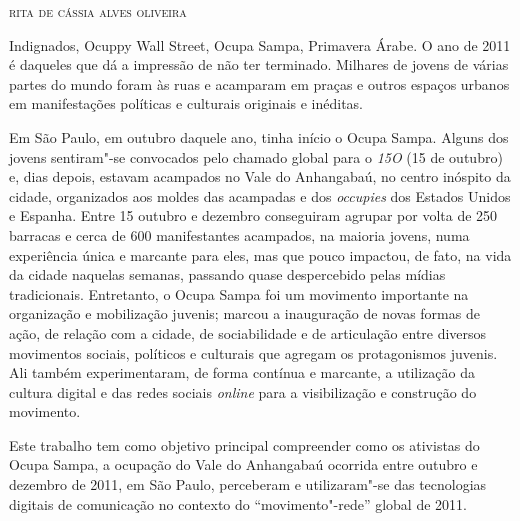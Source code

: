 
\begin{flushright}
\textsc{rita de cássia alves oliveira}
\end{flushright}

\noindent{}Indignados, Ocuppy Wall Street, Ocupa Sampa, Primavera Árabe. O ano de
2011 é daqueles que dá a impressão de não ter terminado. Milhares de
jovens de várias partes do mundo foram às ruas e acamparam em praças e
outros espaços urbanos em manifestações políticas e culturais originais
e inéditas.

Em São Paulo, em outubro daquele ano, tinha início o Ocupa Sampa. Alguns
dos jovens sentiram"-se convocados pelo chamado global para o \textit{15O} (15 de
outubro) e, dias depois, estavam acampados no Vale do Anhangabaú, no
centro inóspito da cidade, organizados aos moldes das acampadas e dos
\textit{occupies} dos Estados Unidos e Espanha. Entre 15 outubro e dezembro
conseguiram agrupar por volta de 250 barracas e cerca de 600
manifestantes acampados, na maioria jovens, numa experiência única e
marcante para eles, mas que pouco impactou, de fato, na vida da cidade
naquelas semanas, passando quase despercebido pelas mídias tradicionais.
Entretanto, o Ocupa Sampa foi um movimento importante na organização e
mobilização juvenis; marcou a inauguração de novas formas de ação, de
relação com a cidade, de sociabilidade e de articulação entre diversos
movimentos sociais, políticos e culturais que agregam os protagonismos
juvenis. Ali também experimentaram, de forma contínua e marcante, a
utilização da cultura digital e das redes sociais \textit{online} para a
visibilização e construção do movimento.

Este trabalho tem como objetivo principal compreender como os
ativistas do Ocupa Sampa, a ocupação do Vale do Anhangabaú ocorrida
entre outubro e dezembro de 2011, em São Paulo, perceberam e
utilizaram"-se das tecnologias digitais de comunicação no contexto do
``movimento"-rede'' global de 2011.

